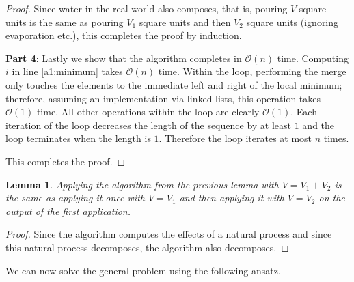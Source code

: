 \documentclass[11pt,a4paper]{article}
\newtheorem{lem}{Lemma}
\newcommand{\bO}{\mathcal{O}}
\begin{document}
\begin{proof}
Since water in the real world also composes, that is, pouring $V$ square units is the same as pouring $V_1$ square units and then $V_2$ square units (ignoring evaporation etc.), this completes the proof by induction.

\textbf{Part 4}: Lastly we show that the algorithm completes in $\bO(n)$ time.
Computing $i$ in line \ref{a1:minimum} takes $\bO(n)$ time.
Within the loop, performing the merge only touches the elements to the immediate left and right of the local minimum; therefore, assuming an implementation via linked lists, this operation takes $\bO(1)$ time.
All other operations within the loop are clearly $\bO(1)$.
Each iteration of the loop decreases the length of the sequence by at least $1$ and the loop terminates when the length is $1$.
Therefore the loop iterates at most $n$ times.

This completes the proof.
\end{proof}

\begin{lem}
  \label{compose}
  Applying the algorithm from the previous lemma with $V = V_1 + V_2$ is the same as applying
  it once with $V = V_1$ and then applying it with $V = V_2$ on the output of the first application.
\end{lem}

\begin{proof}
  Since the algorithm computes the effects of a natural process and since this natural process decomposes, the algorithm also decomposes.
\end{proof}

We can now solve the general problem using the following ansatz.
\end{document}
